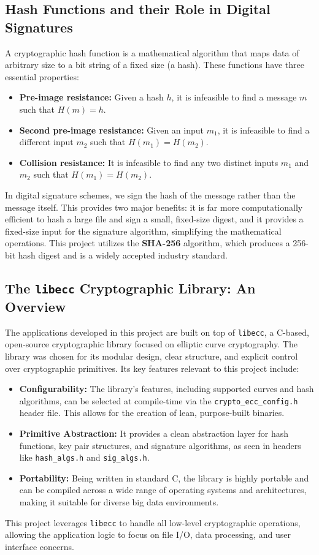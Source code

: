 \documentclass[12pt, letterpaper]{article}
\begin{document}
	\subsection{Hash Functions and their Role in Digital Signatures}
	A cryptographic hash function is a mathematical algorithm that maps data of arbitrary size to a bit string of a fixed size (a hash). These functions have three essential properties:
	\begin{itemize}
		\item \textbf{Pre-image resistance:} Given a hash $h$, it is infeasible to find a message $m$ such that $H(m) = h$.
		\item \textbf{Second pre-image resistance:} Given an input $m_1$, it is infeasible to find a different input $m_2$ such that $H(m_1) = H(m_2)$.
		\item \textbf{Collision resistance:} It is infeasible to find any two distinct inputs $m_1$ and $m_2$ such that $H(m_1) = H(m_2)$.
	\end{itemize}
	In digital signature schemes, we sign the hash of the message rather than the message itself. This provides two major benefits: it is far more computationally efficient to hash a large file and sign a small, fixed-size digest, and it provides a fixed-size input for the signature algorithm, simplifying the mathematical operations. This project utilizes the \textbf{SHA-256} algorithm, which produces a 256-bit hash digest and is a widely accepted industry standard.
	
	\subsection{The \texttt{libecc} Cryptographic Library: An Overview}
	The applications developed in this project are built on top of \texttt{libecc}, a C-based, open-source cryptographic library focused on elliptic curve cryptography. The library was chosen for its modular design, clear structure, and explicit control over cryptographic primitives. Its key features relevant to this project include:
	\begin{itemize}
		\item \textbf{Configurability:} The library's features, including supported curves and hash algorithms, can be selected at compile-time via the \texttt{crypto\_ecc\_config.h} header file. This allows for the creation of lean, purpose-built binaries.
		\item \textbf{Primitive Abstraction:} It provides a clean abstraction layer for hash functions, key pair structures, and signature algorithms, as seen in headers like \texttt{hash\_algs.h} and \texttt{sig\_algs.h}.
		\item \textbf{Portability:} Being written in standard C, the library is highly portable and can be compiled across a wide range of operating systems and architectures, making it suitable for diverse big data environments.
	\end{itemize}
	This project leverages \texttt{libecc} to handle all low-level cryptographic operations, allowing the application logic to focus on file I/O, data processing, and user interface concerns.
	
\end{document}
